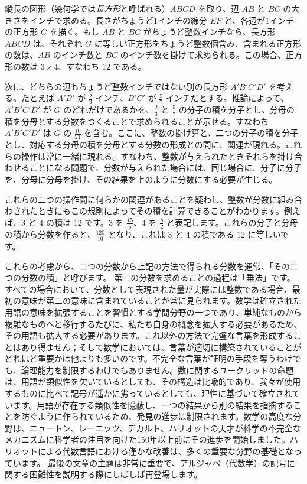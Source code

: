\documentclass[a4paper,11pt,openany]{ltjsbook}
\begin{document}
縦長の図形（幾何学では\emph{長方形}と呼ばれる）$ABCD$ を取り、辺 $AB$ と $BC$ の大きさをインチで求める。長さがちょうど1インチの線分 $EF$ と、各辺が1インチの正方形 $G$ を描く。もし $AB$ と $BC$ がちょうど整数インチなら、長方形 $ABCD$ は、それぞれ $G$ に等しい正方形をちょうど整数個含み、含まれる正方形の数は、$AB$ のインチ数と $BC$ のインチ数を掛けて求められる。この場合、正方形の数は $3 \times 4$、すなわち $12$ である。

次に、どちらの辺もちょうど整数インチではない別の長方形 $A'B'C'D'$ を考える。たとえば $A'B'$ が $\frac{2}{3}$ インチ、$B'C'$ が $\frac{5}{7}$ インチだとする。推論によって、$A'B'C'D'$ が $G$ のどれだけであるかを、$\frac{2}{3}$ と $\frac{5}{7}$ の分子の積を分子とし、分母の積を分母とする分数をつくることで求められることが示せる。すなわち $A'B'C'D'$ は $G$ の $\frac{10}{21}$ を含む。ここに、整数の掛け算と、二つの分子の積を分子とし、対応する分母の積を分母とする分数の形成との間に、関連が現れる。これらの操作は常に一緒に現れる。すなわち、整数が与えられたときそれらを掛け合わせることになる問題で、分数が与えられた場合には、同じ場合に、分子に分子を、分母に分母を掛け、その結果を上のように分数にする必要が生じる。

これらの二つの操作間に何らかの関連があることを疑わし、整数が分数に組み合わされたときにもこの規則によってその積を計算できることがわかります。例えば、$3$ と $4$ の積は $12$ です。$3$ を $\frac{15}{5}$、$4$ を $\frac{8}{2}$ と表記します。これらの分子と分母の積から分数を作ると、$\frac{120}{10}$ となり、これは $3$ と $4$ の積である $12$ に等しいです。

これらの考慮から、二つの分数から上記の方法で得られる分数を通常、「その二つの分数の積」と呼びます。
第三の分数を求めることの過程は「乗法」です。すべての場合において、分数として表現された量が実際には整数である場合、最初の意味が第二の意味に含まれていることが常に見られます。数学は確立された用語の意味を拡張することを習慣とする学問分野の一つであり、単純なものから複雑なものへと移行するたびに、私たち自身の概念を拡大する必要があるため、その用語も拡大する必要があります。これ以外の方法で完璧な言葉を形成することはあり得ません；そして数学においては、言葉が適切に構築されていることがどれほど重要かは他よりも多いのです。不完全な言葉が証明の手段を奪うわけでも、論理能力を制限するわけでもありません。数に関するユークリッドの命題は、用語が類似性を欠いているとしても、その構造は比喩的であり、我々が使用するものに比べて記号が遥かに劣っているとしても、理性に基づいて確立されています。用語が存在する類似性を隠蔽し、一つの結果から別の結果を指摘することを防ぐように作られているため、発見の進歩は制限されます。数学の高度な分野は、ニュートン、レーニッツ、デカルト、ハリオットの天才が科学の不完全なメカニズムに科学者の注目を向けた150年以上前にその進歩を開始しました。ハリオットによる代数言語における僅かな改善は、多くの重要な分野の基礎となっています。
最後の文章の主題は非常に重要で、アルジャベ（代数学）の記号に関する困難性を説明する際にしばしば再登場します。
\end{document}
